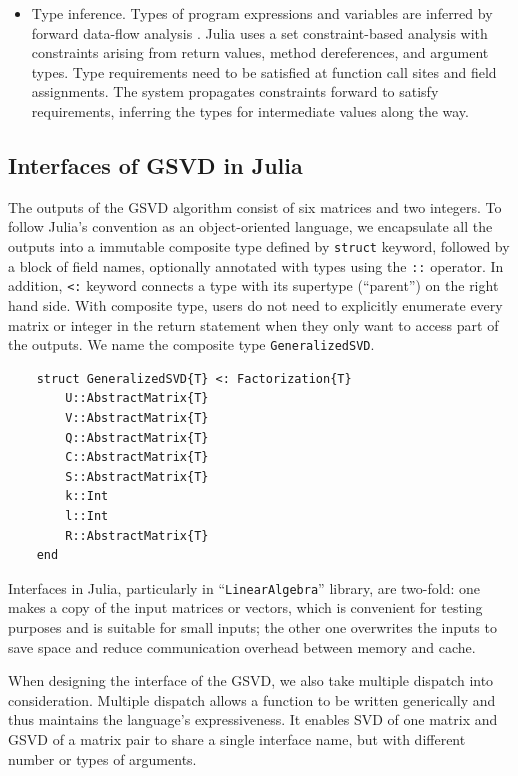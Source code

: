 \begin{enumerate}
\begin{itemize}
\item Type inference.
Types of program expressions and variables are inferred by forward data-flow analysis \cite{bezanson2012julia}. Julia uses a set constraint-based analysis with constraints arising from return values, method dereferences, and argument types. Type requirements need to be satisfied at function call sites and field assignments. The system propagates constraints forward to satisfy requirements, inferring the types for intermediate values along the way.
\end{itemize} 

\end{enumerate} 

\subsection{Interfaces of GSVD in Julia}

The outputs of the GSVD algorithm consist of six matrices and two integers. 
To follow Julia's convention as an object-oriented language, we encapsulate 
all the outputs into a immutable composite type defined by {\tt struct} keyword,
followed by a block of field names, 
optionally annotated with types using the {\tt ::} operator.  In addition, {\tt <:} keyword 
connects a type with its supertype (``parent'') on the right hand side.
With composite type, users do not need to explicitly enumerate every matrix 
or integer in the return statement when they only want to access part of the outputs. 
We name the composite type {\tt GeneralizedSVD}. 

\begin{verbatim} 
    struct GeneralizedSVD{T} <: Factorization{T}
        U::AbstractMatrix{T}
        V::AbstractMatrix{T}
        Q::AbstractMatrix{T}
        C::AbstractMatrix{T}
        S::AbstractMatrix{T}
        k::Int
        l::Int
        R::AbstractMatrix{T}
    end
\end{verbatim} 

Interfaces in Julia, particularly in ``\texttt{LinearAlgebra}'' library, 
are two-fold: one makes a copy of the input matrices or vectors, which
is convenient for testing purposes and is suitable for small inputs; 
the other one overwrites the inputs to save space and reduce communication overhead
between memory and cache. 

When designing the interface 
of the GSVD, we also take multiple dispatch into consideration. 
Multiple dispatch allows a function to be written 
generically and thus maintains the language's expressiveness.
It enables SVD of one matrix and GSVD of a matrix pair 
to share a single interface name, but with different number or types of 
arguments.  

